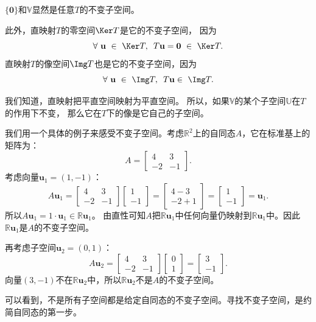 \documentclass[12pt,UTF8]{ctexbook}
\begin{document}
$\{\mathbf{0}\}$和$\mathbb{V}$显然是任意$T$的不变子空间。

此外，直映射$T$的零空间$\Ker T$是它的不变子空间，
因为
$$\forall \,\, \mathbf{u} \,\, \in \,\, \Ker T, \,\,\, T\mathbf{u} = \mathbf{0} \,\, \in \,\, \Ker T. $$
直映射$T$的像空间$\Img T$也是它的不变子空间，因为
$$\forall \,\, \mathbf{u} \,\, \in \,\, \Img T, \,\,\, T\mathbf{u} \in \,\, \Img T. $$

我们知道，直映射把平直空间映射为平直空间。
所以，如果$\mathbb{V}$的某个子空间$\mathbb{U}$在$T$的作用下不变，
那么它在$T$下的像是它自己的子空间。

我们用一个具体的例子来感受不变子空间。考虑$\mathbb{R}^2$上的自同态$A$，它在标准基上的矩阵为：
$$
A = \begin{bmatrix} 4 & 3 \\ -2 & -1 \end{bmatrix}.
$$
考虑向量$\mathbf{u}_1 = (1,-1)$：
$$
A \mathbf{u}_1 = \begin{bmatrix} 4 & 3 \\ -2 & -1 \end{bmatrix}\begin{bmatrix} 1 \\ -1 \end{bmatrix} = \begin{bmatrix} 4-3 \\ -2+1 \end{bmatrix} = \begin{bmatrix} 1 \\ -1 \end{bmatrix} = \mathbf{u}_1.
$$
所以$A\mathbf{u}_1 = 1\cdot \mathbf{u}_1 \in \mathbb{R}\mathbf{u}_1$。
由直性可知$A$把$\mathbb{R}\mathbf{u}_1$中任何向量仍映射到$\mathbb{R}\mathbf{u}_1$中。因此$\mathbb{R}\mathbf{u}_1$是$A$的不变子空间。

再考虑子空间$\mathbf{u}_2 = (0,1)$：
$$
A \mathbf{u}_2 = \begin{bmatrix} 4 & 3 \\ -2 & -1 \end{bmatrix} \begin{bmatrix} 0 \\ 1 \end{bmatrix} = \begin{bmatrix} 3 \\ -1 \end{bmatrix}.
$$
向量$(3,-1)$不在$\mathbb{R}\mathbf{u}_2$中，所以$\mathbb{R}\mathbf{u}_2$不是$A$的不变子空间。

可以看到，不是所有子空间都是给定自同态的不变子空间。寻找不变子空间，是约简自同态的第一步。
\end{document}
